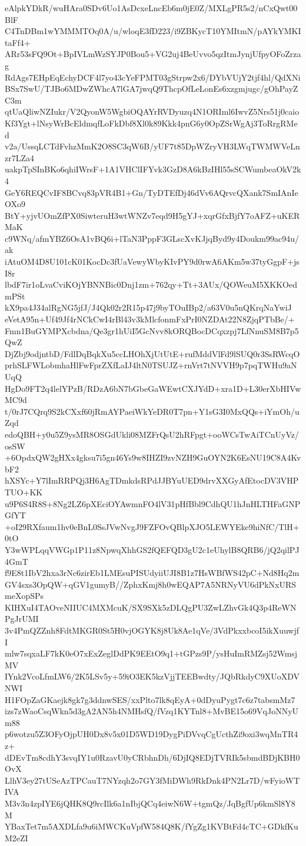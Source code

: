 eAlpkYDkR/wuHAra0SDv6Uo1AsDcxeLncEb6m0jE0Z/MXLgPR5s2/nCxQwt00BlF
C4TnDBm1wYMMMTOq0A/u/wloqE3fD223/i9ZBKycT10YMItmN/pAYkYMKItaFf4+
ARr53sFQ9Ot+BpIVLmWzSYJP0Bou5+VG2uj4BeUvvo5qzItmJynjUfpyOFoZrzag
RdAgs7EHpEqEchyDCF4l7yo43cYeFPMT03gStrpw2x6/DYbVUjY2tjf4hl/QdXNi
BSx7SwU/TJBo6MDwZWhcA7lGA7jwqQ9ThcpOfLeLonEs6xzgmjugc/gOhPayZC3m
qtUaQliwNZIukr/V2QyonW5WgbiOQAYrRVDyuzq4N1ORIml6IwvZ5Nrs51j0caio
Kf3Ygt+lNsyWrBcEldmqfLoFkDbf8Xl0k89Kkk4pnG6y0OpZSrWgAj3ToRrgRMed
v2a/UssqLCTdFvhzMmK2O8SC3qW6B/yUF7t85DpWZryVH3LWqTWMWVeLnzr7LZa4
uakpTpSInBKo6qhiIWrsF+1A1VHClIFYvk3GzD8A6kBzIHl55sSCWumbeaOkV2k4
GeY6REQCvIF8BCvq83pVR4B1+Gn/TyDTEfDj46dVv6AQrvcQXank7SmIAnIeOXo9
BtY+yjvUOmZfPX0SiwteruH3wtWNZv7eqd9H5gYJ+xqrGfxBjfY7oAFZ+uKERMaK
c9WNq/afmYBZ6OsA1vBQ6i+lTaN3PppF3GLscXvKJjqByd9y4Doukm99ac94u/ak
iAtuOM4D8U101cK01KocDc3fUaVewyWbyKIvPY9d0rwA6AKm5w37tyGgpF+jsI8r
lbdF7ir1oLvaCviKOjYBNNBic0Dnj1zm+762qy+Tt+3AUx/QOWeuM5XKKOedmPSt
kX9pa4J34alRgNG5jfJ/J4Qk02r2R15p47j9byTOuIBp2/a63V0u5nQKrqNaYwiJ
eVetA95n+Uf49Jf4rNCkCwI4rBl43v3kMlcfonmFxPrI0NZDAt22N8ZjqPTbBe/+
Fmn1BuGYMPXcbdna/Qe3gr1hUiI5GcNvv8kORQBocDCqxzpj7LfNnuSM8B7p5QwZ
DjZbj9odjntbD/FdlDqBqkXu5ccLHOhXjUtUtE+rufMddVlFd9lSUQ0r3SsRWcqO
prhSLFWLobmhaHlFwFprZXfLaIJ4ltN0TSUJZ+rnVrt7tNVVH9p7pqTWHu9aNUqQ
HgDo9FT2q4lelYPzB/RDzA6bN7bGbeGaWEwtCXJYdD+xra1D+L30erXbHIVwMC9d
t/0rJ7CQrq9S2kCXxf60jRmAYPaeiWkYeDR0T7pn+Y1sG3I0MxQQs+iYmOh/uZqd
edoQBH+y0u5Z9ysMR8OSGdUkli08MZFrQsU2hRFpgt+ooWCsTwAiTCnUyVz/osSW
+6OpdxQW2gHXx4gksu7i5gn46Ys9w8IHZI9zvNZH9GuOYN2K6EsNU19C8A4KvbF2
hXSYc+Y7lImRRPQj3H6AgTDmkdsRPdJJBYuUED9drvXXGyAfEtocDV3VHPTUO+KK
u9P6S4R8S+8Ng2LZ6pXEciOYAwmnFO4lV31pHfBbl9CdhQU1hJnHLTHFaGNPGfYT
+oI29RXfaum1hv0eBnL0SsJVwNvgJ9FZFOvQBlpXJO5LEWYEke9hiNfC/TlH+0tO
Y3wWPLqqVWGp1P11z8NpwqXhhGS2fQEFQD3gU2c1eUhylB8QRB6/jQ2qilPJ4GmT
f9E8t1IbV2hxa3rNc6zirEb1LMEsuPISUdyiiUJI8B1z7HsWBfWS42pC+Nd8Hq2m
GV4sxs3OpQW+qGV1gumyB//ZphxKmj8h0wEQAP7A5NRNyVU6dPkNxURSmeXopSPs
KIHXuI4TAOveNIIUC4MXMcuK/SX9SXk5zDLQgPU3ZwLZhvGk4Q3p4ReWNPgJrUMI
3v4PmQZZnh8FdtMKGR0St5H0vjOGYK8j8Uk8Ae1qVe/3VdPkxxbcoI5ikXuuwjfI
mlw7sqxaLF7kK0eO7xExZeglDdPK9EEtO9q1+tGPzs9P/ysHuImRMZsj52WmsjMV
IYnk2VcoLfmLW6/2K5LSv5y+59iO3EK5kzVjjTEEBwdty/JQbRkdyC9XUoXDVNWI
H1FOpZaGKaejk8gk7g3ddnwSES/xxPlto7lk8qEyA+0dDyuPygt7c6z7tabsmMz7
izs7zWaoCsqWkn5d3gA2AN5h4NMHsfQ/fVzq1KYTnl8+MvBE15o69VqJoNNyUm88
p6wotzu5Z3OFyOjpUH0Dx8v5x01D5WD19DygPiDVvqCgUcthZi9oxi3wqMnTR4z+
dDEvTm8cdhY3svqIY1u0RzavU0yCRbhnDh/6DjIQ8EDjTVRIk5sbmdBDjKBH0OvX
LlhV3ey27tUSeAzTPCauT7NYzqh2o7GY3fMiDWh9RkDnk4PN2Lr7D/wFyioWTIVA
M3v3n4zpIYE6jQHK8Q9rcIlk6a1nIbjQCq4eiwN6W+tgmQz/JqBgfUp6kmSl8Y8M
YBaxTet7m5AXDLfa9u6iMWCKuVpfW584Q8K/fYgZg1KVBtFd4cTC+GDkfKuM2eZI
